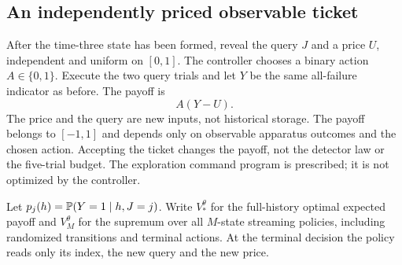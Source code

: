 \documentclass[11pt]{amsart}
\theoremstyle{definition}\newtheorem{definition}[theorem]{Definition}
\theoremstyle{remark}\newtheorem{remark}[theorem]{Remark}
\begin{document}
\subsection{An independently priced observable ticket}
After the time-three state has been formed, reveal the query $J$ and a
price $U$, independent and uniform on $[0,1]$. The controller chooses a
binary action $A\in\{0,1\}$. Execute the two query trials and let $Y$
be the same all-failure indicator as before. The payoff is
\begin{equation}\label{eq:ticket-payoff}
 A(Y-U).
\end{equation}
The price and the query are new inputs, not historical storage. The
payoff belongs to $[-1,1]$ and depends only on observable apparatus
outcomes and the chosen action. Accepting the ticket changes the payoff,
not the detector law or the five-trial budget. The exploration command
program is prescribed; it is not optimized by the controller.

Let $p_j(h)=\mathbb P(Y=1\mid h,J=j)$. Write $V_*^\theta$ for the
full-history optimal expected payoff and $V_M^\theta$ for the supremum
over all $M$-state streaming policies, including randomized transitions
and terminal actions. At the terminal decision the policy reads only its
index, the new query and the new price.
\end{document}
